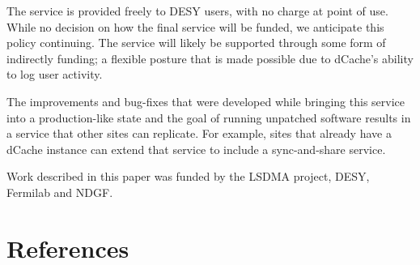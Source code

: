 \documentclass[a4paper]{jpconf}
\begin{document}
The service is provided freely to DESY users, with no charge at point
of use.  While no decision on how the final service will be funded, we
anticipate this policy continuing.  The service will likely be
supported through some form of indirectly funding; a flexible posture
that is made possible due to dCache's ability to log user activity.

The improvements and bug-fixes that were developed while bringing this
service into a production-like state and the goal of running unpatched
software results in a service that other sites can replicate.  For
example, sites that already have a dCache instance can extend that
service to include a sync-and-share service.

\ack

Work described in this paper was funded by the LSDMA project, DESY,
Fermilab and NDGF.

\section*{References}

\end{document}
